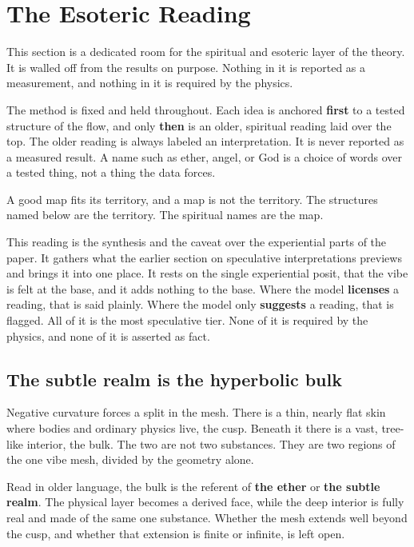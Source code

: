 \section{The Esoteric Reading}

This section is a dedicated room for the spiritual and esoteric layer of the theory. It is walled off from the results on purpose. Nothing in it is reported as a measurement, and nothing in it is required by the physics.

The method is fixed and held throughout. Each idea is anchored \textbf{first} to a tested structure of the flow, and only \textbf{then} is an older, spiritual reading laid over the top. The older reading is always labeled an interpretation. It is never reported as a measured result. A name such as ether, angel, or God is a choice of words over a tested thing, not a thing the data forces.

\begin{principle}
A good map fits its territory, and a map is not the territory. The structures named below are the territory. The spiritual names are the map.
\end{principle}

This reading is the synthesis and the caveat over the experiential parts of the paper. It gathers what the earlier section on speculative interpretations previews and brings it into one place. It rests on the single experiential posit, that the vibe is felt at the base, and it adds nothing to the base. Where the model \textbf{licenses} a reading, that is said plainly. Where the model only \textbf{suggests} a reading, that is flagged. All of it is the most speculative tier. None of it is required by the physics, and none of it is asserted as fact.

\subsection{The subtle realm is the hyperbolic bulk}

Negative curvature forces a split in the mesh. There is a thin, nearly flat skin where bodies and ordinary physics live, the cusp. Beneath it there is a vast, tree-like interior, the bulk. The two are not two substances. They are two regions of the one vibe mesh, divided by the geometry alone.

Read in older language, the bulk is the referent of \textbf{the ether} or \textbf{the subtle realm}. The physical layer becomes a derived face, while the deep interior is fully real and made of the same one substance. Whether the mesh extends well beyond the cusp, and whether that extension is finite or infinite, is left open.

